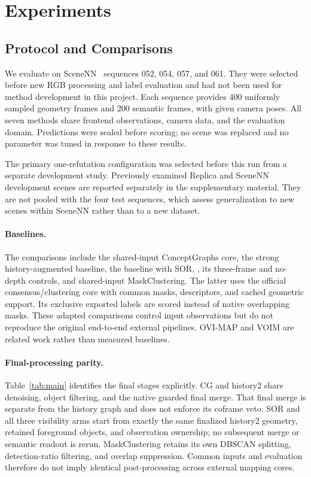 \section{Experiments}
\label{sec:experiments}
\subsection{Protocol and Comparisons}
We evaluate on SceneNN~\cite{scenenn_dataset} sequences 052, 054, 057, and 061. They were selected before new RGB processing and label evaluation and had not been used for method development in this project. Each sequence provides 400 uniformly sampled geometry frames and 200 semantic frames, with given camera poses. All seven methods share frontend observations, camera data, and the evaluation domain. Predictions were sealed before scoring; no scene was replaced and no parameter was tuned in response to these results.

The primary one-refutation configuration was selected before this run from a separate development study. Previously examined Replica and SceneNN development scenes are reported separately in the supplementary material. They are not pooled with the four test sequences, which assess generalization to new scenes within SceneNN rather than to a new dataset.

\paragraph{Baselines.} The comparisons include the shared-input ConceptGraphs core, the strong history-augmented baseline, the baseline with SOR, \ours{}, its three-frame and no-depth controls, and shared-input MaskClustering. The latter uses the official consensus/clustering core with common masks, descriptors, and cached geometric support. Its exclusive exported labels are scored instead of native overlapping masks. These adapted comparisons control input observations but do not reproduce the original end-to-end external pipelines. OVI-MAP and VOIM are related work rather than measured baselines.

\paragraph{Final-processing parity.} Table~\ref{tab:main} identifies the final stages explicitly. CG and history2 share denoising, object filtering, and the native guarded final merge. That final merge is separate from the history graph and does not enforce its coframe veto. SOR and all three visibility arms start from exactly the same finalized history2 geometry, retained foreground objects, and observation ownership; no subsequent merge or semantic readout is rerun. MaskClustering retains its own DBSCAN splitting, detection-ratio filtering, and overlap suppression. Common inputs and evaluation therefore do not imply identical post-processing across external mapping cores.

